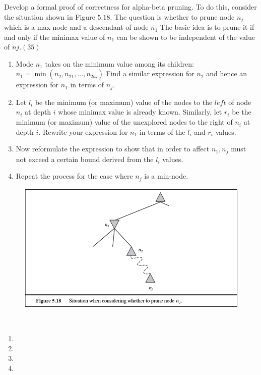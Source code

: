\begin{exercise}[Search]{Develop a formal proof of correctness for alpha-beta pruning. To do this,
  consider the situation shown in Figure $5.18 .$ The question is whether to prune node $n_{j}$ which is a max-node and a descendant of node $n_{1}$ The basic idea is to prune it if and
  only if the minimax value of $n_{1}$ can be shown to be independent of the value of $n j .(35)$
  \begin{enumerate}
    \item Mode $n_{1}$ takes on the minimum value among its children: $n_{1}=\min \left(n_{2}, n_{21}, \ldots, n_{2 b_{2}}\right)$ Find a similar expression for $n_{2}$ and hence an expression for $n_{1}$ in terms of $n_{j}$.
    \item Let $l_{i}$ be the minimum (or maximum) value of the nodes to the $l e f t$ of node $n_{i}$ at depth $i$ whose minimax value is already known. Similarly, let $r_{i}$ be the minimum (or maximum) value of the unexplored nodes to the right of $n_{i}$ at depth $i .$ Rewrite your expression for $n_{1}$ in terms of the $l_{i}$ and $r_{i}$ values.
    \item Now reformulate the expression to show that in order to affect $n_{1}, n_{j}$ must not exceed a certain bound derived from the $l_{i}$ values.
    \item Repeat the process for the case where $n_{j}$ is a min-node.
  \end{enumerate}
  \begin{figure}
    \begin{center}
      \includegraphics[width=12cm]{img/ex1-1.png}
    \end{center}
  \end{figure}
  }
  \begin{solution}
  \par{~}
  \begin{enumerate}
    \item {

    }
    \item {
      
    }
    \item {
      
    }
    \item {
      
    }
  \end{enumerate}
  \end{solution}
  \label{ex4}
\end{exercise}